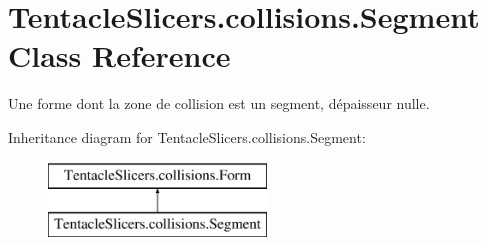 \hypertarget{class_tentacle_slicers_1_1collisions_1_1_segment}{}\section{Tentacle\+Slicers.\+collisions.\+Segment Class Reference}
\label{class_tentacle_slicers_1_1collisions_1_1_segment}


Une forme dont la zone de collision est un segment, d\textquotesingle{}épaisseur nulle.  


Inheritance diagram for Tentacle\+Slicers.\+collisions.\+Segment\+:\begin{figure}[H]
\begin{center}
\leavevmode
\includegraphics[height=2.000000cm]{class_tentacle_slicers_1_1collisions_1_1_segment}
\end{center}
\end{figure}
